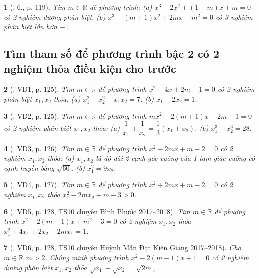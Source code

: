 \documentclass{article}
\newtheorem{baitoan}{}
\begin{document}
\begin{baitoan}[\cite{Thu_Viet_Minh_ptb2}, 6., p. 119]
	Tìm $m\in\mathbb{R}$ để phương trình: (a) $x^3 - 2x^2 + (1 - m)x + m = 0$ có 2 nghiệm dương phân biệt. (b) $x^3 - (m + 1)x^2 + 2mx - m^2 = 0$ có 3 nghiệm phân biệt lớn hơn $-1$.
\end{baitoan}

\subsection{Tìm tham số để phương trình bậc 2 có 2 nghiệm thỏa điều kiện cho trước}

\begin{baitoan}[\cite{Thu_Viet_Minh_ptb2}, VD1, p. 125]
	Tìm $m\in\mathbb{R}$ để phương trình $x^2 - 4x + 2m - 1 = 0$ có 2 nghiệm phân biệt $x_1,x_2$ thỏa: (a) $x_1^2 + x_2^2 - x_1x_2 = 7$. (b) $x_1 - 2x_2 = 1$.
\end{baitoan}

\begin{baitoan}[\cite{Thu_Viet_Minh_ptb2}, VD2, p. 125]
	Tìm $m\in\mathbb{R}$ để phương trình $mx^2 - 2(m + 1)x + 2m + 1 = 0$ có 2 nghiệm phân biệt $x_1,x_2$ thỏa: (a) $\dfrac{1}{x_1} + \dfrac{1}{x_2} = \dfrac{1}{3}(x_1 + x_2)$. (b) $x_1^3 + x_2^3 = 28$.
\end{baitoan}

\begin{baitoan}[\cite{Thu_Viet_Minh_ptb2}, VD3, p. 126]
	Tìm $m\in\mathbb{R}$ để phương trình $x^2 - 2mx + m - 2 = 0$ có 2 nghiệm $x_1,x_2$ thỏa: (a) $x_1,x_2$ là độ dài 2 cạnh góc vuông của 1 tam giác vuông có cạnh huyền bằng $\sqrt{60}$. (b) $x_1^2 = 9x_2$.
\end{baitoan}

\begin{baitoan}[\cite{Thu_Viet_Minh_ptb2}, VD4, p. 127]
	Tìm $m\in\mathbb{R}$ để phương trình $x^2 + 2mx + m - 2 = 0$ có 2 nghiệm $x_1,x_2$ thỏa $x_1^2 - 2mx_2 + m - 3 > 0$.
\end{baitoan}

\begin{baitoan}[\cite{Thu_Viet_Minh_ptb2}, VD5, p. 128, TS10 chuyên Bình Phước 2017--2018]
	Tìm $m\in\mathbb{R}$ để phương trình $x^2 - 2(m - 1)x + m^2 - 3 = 0$ có 2 nghiệm $x_1,x_2$ thỏa $x_1^2 + 4x_1 + 2x_2 - 2mx_1 = 1$.
\end{baitoan}

\begin{baitoan}[\cite{Thu_Viet_Minh_ptb2}, VD6, p. 128, TS10 chuyên Huỳnh Mẫn Đạt Kiên Giang 2017--2018]
	Cho $m\in\mathbb{R},m > 2$. Chứng minh phương trình $x^2 - 2(m - 1)x + 1 = 0$ có 2 nghiệm dương phân biệt $x_1,x_2$ thỏa $\sqrt{x_1} + \sqrt{x_2} = \sqrt{2m}$,
\end{baitoan}
\end{document}
